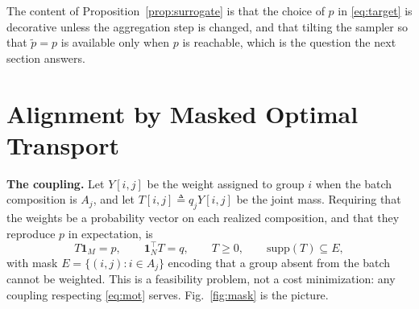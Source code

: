 \documentclass{article}
\theoremstyle{definition}
\begin{document}
The content of Proposition~\ref{prop:surrogate} is that the choice of $p$ in
\eqref{eq:target} is decorative unless the aggregation step is changed, and that
tilting the sampler so that $\tilde p=p$ is available only when $p$ is
reachable, which is the question the next section answers.

\section{Alignment by Masked Optimal Transport}
\label{sec:gavot}

\noindent\textbf{The coupling.}
Let $Y[i,j]$ be the weight assigned to group $i$ when the batch composition is
$A_j$, and let $T[i,j]\triangleq q_j Y[i,j]$ be the joint mass. Requiring that
the weights be a probability vector on each realized composition, and that they
reproduce $p$ in expectation, is
\begin{equation}
T\mathbf{1}_M=p,\qquad \mathbf{1}_N^\top T=q,\qquad T\ge 0,
\qquad \mathrm{supp}(T)\subseteq E,
\label{eq:mot}
\end{equation}
with mask $E=\{(i,j): i\in A_j\}$ encoding that a group absent from the batch
cannot be weighted. This is a feasibility problem, not a cost minimization:
any coupling respecting \eqref{eq:mot} serves. Fig.~\ref{fig:mask} is the
picture.
\end{document}
